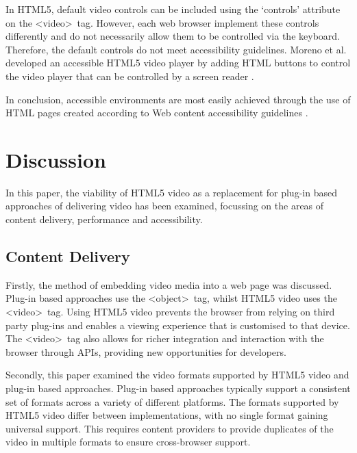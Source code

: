 \documentclass[journal]{IEEEtran}
\begin{document}

In HTML5, default video controls can be included using the `controls' attribute on the \textless video\textgreater~tag. However, each web browser implement these controls differently and do not necessarily allow them to be controlled via the keyboard. Therefore, the default controls do not meet accessibility guidelines. Moreno et al. developed an accessible HTML5 video player by adding HTML buttons to control the video player that can be controlled by a screen reader \cite{incollection:html5SupportForAnAccessibleWeb}.

In conclusion, accessible environments are most easily achieved through the use of HTML pages created according to Web content accessibility guidelines \cite{incollection:accessibilityEvaluationForMultimediaContent}.

\section{Discussion}
In this paper, the viability of HTML5 video as a replacement for plug-in based approaches of delivering video has been examined, focussing on the areas of content delivery, performance and accessibility.

\subsection{Content Delivery}
Firstly, the method of embedding video media into a web page was discussed. Plug-in based approaches use the \textless object\textgreater~tag, whilst HTML5 video uses the \textless video\textgreater~tag. Using HTML5 video prevents the browser from relying on third party plug-ins and enables a viewing experience that is customised to that device. The \textless video\textgreater~tag also allows for richer integration and interaction with the browser through APIs, providing new opportunities for developers.

Secondly, this paper examined the video formats supported by HTML5 video and plug-in based approaches. Plug-in based approaches typically support a consistent set of formats across a variety of different platforms. The formats supported by HTML5 video differ between implementations, with no single format gaining universal support. This requires content providers to provide duplicates of the video in multiple formats to ensure cross-browser support.
\end{document}
